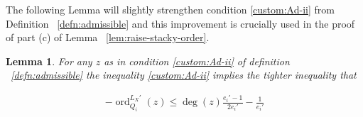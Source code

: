 \documentclass{amsart}
\theoremstyle{plain}
\newtheorem{lem}[thm]{Lemma}
\theoremstyle{definition}
\theoremstyle{remark}
\numberwithin{equation}{section}
\newcommand\BN{{\mathbb N}}
\DeclareMathOperator{\ord}{ord}
\newcommand\sx{\mathscr X}
\newcommand \subhalf[1]{\frac{{#1} - 1}{2{#1}}}
\newcommand{\halfcan}{L}
\begin{document}
%

The following Lemma will slightly strengthen condition \ref{custom:Ad-ii} from Definition ~\ref{defn:admissible} and this improvement is crucially used in the proof of part (c) of Lemma ~\ref{lem:raise-stacky-order}.

\begin{lem}
\label{lem:admissible_inequality}
For any $z$ as in condition \ref{custom:Ad-ii} of definition ~\ref{defn:admissible} the inequality \ref{custom:Ad-ii} implies the
tighter inequality that

\begin{align*}
	-\ord_{Q_i}
^{\halfcan_X'}(z) \leq \deg(z) \subhalf{e_i'} -\frac{1}{e_i'}
\end{align*}
\end{lem}
\end{document}
